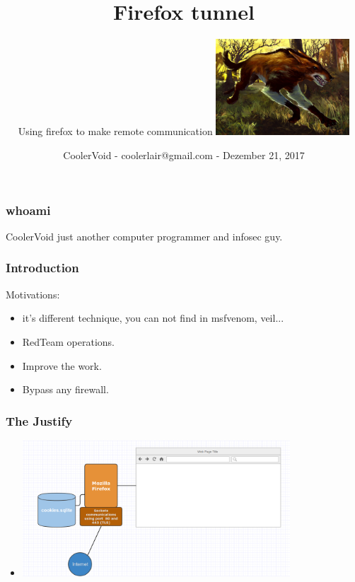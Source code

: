 \documentclass[serif,mathserif]{beamer}
\author[ ]{Using firefox to  make remote communication \quad \includegraphics[width=5.0cm]{img/firefoxtunnel.jpg}}
\title[firefox tunnel\hspace{2em}\insertframenumber/\inserttotalframenumber]{Firefox tunnel}
\date{ CoolerVoid - coolerlair@gmail.com - Dezember 21, 2017} %
\institute{Illustration by Anthony S Waters}
\begin{document}
\maketitle
\begin{frame}
  \frametitle{whoami} 
CoolerVoid just another computer programmer and infosec guy.
\end{frame}

\begin{frame}
  \frametitle{Introduction}
  Motivations:\pause
  \begin{itemize}
    \item it's different technique, you can not find in msfvenom, veil...\pause
  \item RedTeam operations.\pause
  \item Improve the work.\pause
  \item Bypass any firewall. %
  \end{itemize}
\end{frame}


\begin{frame}
  \frametitle{The Justify}
  \begin{itemize}
  \item \includegraphics[width=10.0cm]{img/tunnel1.png}
  \end{itemize}
\end{frame}
\end{document}
